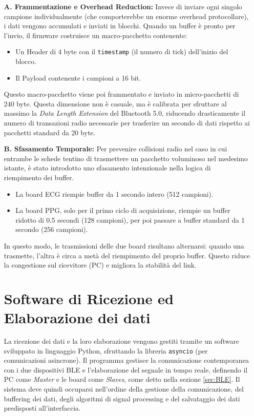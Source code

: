 \documentclass[11pt,a4paper]{article}
\begin{document}
\textbf{A. Frammentazione e Overhead Reduction:} Invece di inviare ogni singolo campione individualmente (che comporterebbe un enorme overhead protocollare), i dati vengono accumulati e inviati in blocchi. Quando un buffer è pronto per l'invio, il firmware costruisce un macro-pacchetto contenente:
\begin{itemize}
    \item Un Header di 4 byte con il \texttt{timestamp} (il numero di tick) dell'inizio del blocco.
    \item Il Payload contenente i campioni a 16 bit.
\end{itemize}
Questo macro-pacchetto viene poi frammentato e inviato in micro-pacchetti di 240 byte. Questa dimensione non è casuale, ma è calibrata per sfruttare al massimo la \textit{Data Length Extension} del Bluetooth 5.0, riducendo drasticamente il numero di transazioni radio necessarie per trasferire un secondo di dati rispetto ai pacchetti standard da 20 byte.


\textbf{B. Sfasamento Temporale:} Per prevenire collisioni radio nel caso in cui entrambe le schede tentino di trasmettere un pacchetto voluminoso nel medesimo istante, è stato introdotto uno sfasamento intenzionale nella logica di riempimento dei buffer.
\begin{itemize}
    \item La board ECG riempie buffer da 1 secondo intero (512 campioni).
    \item La board PPG, solo per il primo ciclo di acquisizione, riempie un buffer ridotto di 0.5 secondi (128 campioni), per poi passare a buffer standard da 1 secondo (256 campioni).
\end{itemize}
In questo modo, le trasmissioni delle due board risultano alternarsi: quando una trasmette, l'altra è circa a metà del riempimento del proprio buffer. Questo riduce la congestione sul ricevitore (PC) e migliora la stabilità del link.
    



\section{Software di Ricezione ed Elaborazione dei dati}

La ricezione dei dati e la loro elaborazione vengono gestiti tramite un software sviluppato in linguaggio Python, sfruttando la libreria \texttt{asyncio} (per comunicazioni asincrone). Il programma gestisce la comunicazione contemporanea con i due dispositivi BLE e l'elaborazione del segnale in tempo reale, definendo il PC come \textit{Master} e le board come \textit{Slaves}, come detto nella sezione \ref{sec:BLE}. Il sistema deve quindi occuparsi nell'ordine della gestione della comunicazione, del buffering dei dati, degli algoritmi di signal processing e del salvataggio dei dati predisposti all'interfaccia.
\end{document}
